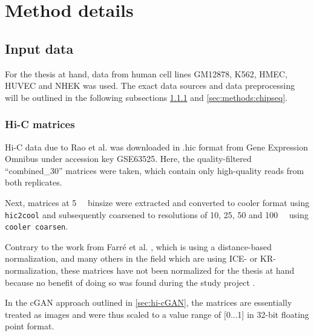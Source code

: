 \section{Method details}

\subsection{Input data}
For the thesis at hand, data from human cell lines GM12878, K562, HMEC, HUVEC and NHEK was used.
The exact data sources and data preprocessing will be outlined in the following subsections \ref{sec:methods:hicMatrices} and \ref{sec:methods:chipseq}.


\subsubsection{Hi-C matrices} \label{sec:methods:hicMatrices}
Hi-C data due to Rao et al. \cite{Rao2014} was downloaded 
in .hic format from Gene Expression Omnibus under accession key GSE63525.
Here, the quality-filtered ``combined\_30'' matrices were taken, which contain only high-quality reads from 
both replicates.

Next, matrices at \SI{5}{\kilo\bp} binsize were extracted and converted to cooler format using \texttt{hic2cool}
and subsequently coarsened to resolutions of 10, 25, 50 and \SI{100}{\kilo\bp} using \texttt{cooler coarsen}.

Contrary to the work from Farr\'e et al. \cite{Farre2018a}, which is using a distance-based normalization,
and many others in the field which are using ICE- or KR-normalization, 
these matrices have not been normalized for the thesis at hand
because no benefit of doing so was found during the study project \cite{Krauth2020}.

In the cGAN approach outlined in \cref{sec:hi-cGAN}, the matrices are essentially treated as images and were
thus scaled to a value range of [0...1] in 32-bit floating point format.

